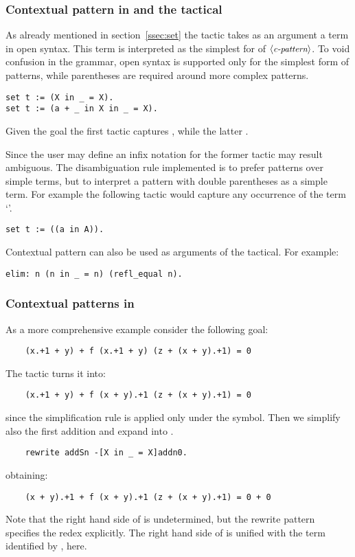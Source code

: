 \subsubsection{Contextual pattern in  and the \C{:} tactical}

As already mentioned in section~\ref{ssec:set} the  tactic
takes as an argument a term in open syntax. This term is interpreted
as the simplest for of $\langle\mbox{\itshape\rmfamily\small c-pattern}\rangle$. To void confusion in the grammar,
open syntax is supported only for the simplest form of patterns, while
 parentheses are required around more complex patterns.

\begin{lstlisting}
set t := (X in _ = X).
set t := (a + _ in X in _ = X).
\end{lstlisting}

Given the goal  the first tactic
captures , while the latter .

Since the user may define an infix notation for  the former
tactic may result ambiguous. The disambiguation rule implemented is
to prefer patterns over simple terms, but to interpret a pattern with
double parentheses as a simple term. For example
the following tactic would capture any occurrence of the term `'.

\begin{lstlisting}
set t := ((a in A)).
\end{lstlisting}

Contextual pattern can also be used as arguments of the \C{:} tactical.
For example:
\begin{lstlisting}
elim: n (n in _ = n) (refl_equal n).
\end{lstlisting}

\subsubsection{Contextual patterns in }
As a more comprehensive example consider the following goal:
\begin{lstlisting}
    (x.+1 + y) + f (x.+1 + y) (z + (x + y).+1) = 0
\end{lstlisting}
The tactic  turns it into:
\begin{lstlisting}
    (x.+1 + y) + f (x + y).+1 (z + (x + y).+1) = 0
\end{lstlisting}
since the simplification rule  is applied only under the  symbol.
Then we simplify also the first addition and expand  into .
\begin{lstlisting}
    rewrite addSn -[X in _ = X]addn0.
\end{lstlisting}
obtaining:
\begin{lstlisting}
    (x + y).+1 + f (x + y).+1 (z + (x + y).+1) = 0 + 0
\end{lstlisting}
Note that the right hand side of  is undetermined, but the
rewrite pattern specifies the redex explicitly. The right hand side of
 is unified with the term identified by ,  here.

